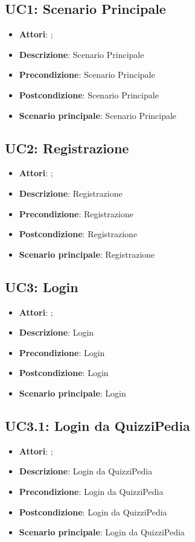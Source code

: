 \subsection{UC1: Scenario Principale}
\label{UC1}
\begin{itemize}
\item \textbf{Attori}: ;
\item \textbf{Descrizione}: Scenario Principale
\item \textbf{Precondizione}: Scenario Principale
\item \textbf{Postcondizione}: Scenario Principale
\item \textbf{Scenario principale}:
Scenario Principale
\end{itemize}

\subsection{UC2: Registrazione}
\label{UC2}
\begin{itemize}
\item \textbf{Attori}: ;
\item \textbf{Descrizione}: Registrazione
\item \textbf{Precondizione}: Registrazione
\item \textbf{Postcondizione}: Registrazione
\item \textbf{Scenario principale}:
Registrazione
\end{itemize}

\subsection{UC3: Login}
\label{UC3}
\begin{itemize}
\item \textbf{Attori}: ;
\item \textbf{Descrizione}: Login
\item \textbf{Precondizione}: Login
\item \textbf{Postcondizione}: Login
\item \textbf{Scenario principale}:
Login
\end{itemize}

\subsection{UC3.1: Login da QuizziPedia}
\label{UC3.1}
\begin{itemize}
\item \textbf{Attori}: ;
\item \textbf{Descrizione}: Login da QuizziPedia
\item \textbf{Precondizione}: Login da QuizziPedia
\item \textbf{Postcondizione}: Login da QuizziPedia
\item \textbf{Scenario principale}:
Login da QuizziPedia
\end{itemize}

